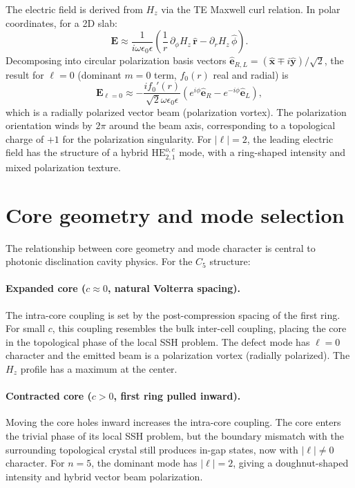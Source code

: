 \documentclass[12pt,a4paper,oneside]{book}
\theoremstyle{plain}
\theoremstyle{definition}
\theoremstyle{remark}
\newcommand{\vb}[1]{\bm{#1}}
\newcommand{\uv}[1]{\hat{\bm{#1}}}
\newcommand{\Efield}{\vb{E}}
\newcommand{\eps}{\epsilon}
\newcommand{\om}{\omega}
\begin{document}
The electric field is derived from $H_z$ via the TE Maxwell curl relation. In polar coordinates, for a 2D slab:
\begin{equation}
  \Efield \approx \frac{1}{i\om\eps_0\eps}\!\left(\frac{1}{r}\,\partial_\phi H_z\,\uv{r} - \partial_r H_z\,\hat{\phi}\right).
  \label{eq:E-from-Hz}
\end{equation}
Decomposing into circular polarization basis vectors $\hat{\vb{e}}_{R,L} = (\uv{x}\mp i\uv{y})/\sqrt{2}$, the result for $\ell = 0$ (dominant $m=0$ term, $f_0(r)$ real and radial) is
\begin{equation}
  \Efield_{\ell=0} \approx -\frac{i f_0'(r)}{\sqrt{2}\om\eps_0\eps}\!\left(e^{i\phi}\hat{\vb{e}}_R - e^{-i\phi}\hat{\vb{e}}_L\right),
  \label{eq:E-ell0}
\end{equation}
which is a radially polarized vector beam (polarization vortex). The polarization orientation winds by $2\pi$ around the beam axis, corresponding to a topological charge of $+1$ for the polarization singularity. For $|\ell|=2$, the leading electric field has the structure of a hybrid $\mathrm{HE}^{o,e}_{2,1}$ mode, with a ring-shaped intensity and mixed polarization texture.

\section{Core geometry and mode selection}
\label{sec:core-geometry}

The relationship between core geometry and mode character is central to photonic disclination cavity physics. For the $C_5$ structure:

\paragraph{Expanded core ($c \approx 0$, natural Volterra spacing).} The intra-core coupling is set by the post-compression spacing of the first ring. For small $c$, this coupling resembles the bulk inter-cell coupling, placing the core in the topological phase of the local SSH problem. The defect mode has $\ell = 0$ character and the emitted beam is a polarization vortex (radially polarized). The $H_z$ profile has a maximum at the center.

\paragraph{Contracted core ($c > 0$, first ring pulled inward).} Moving the core holes inward increases the intra-core coupling. The core enters the trivial phase of its local SSH problem, but the boundary mismatch with the surrounding topological crystal still produces in-gap states, now with $|\ell| \neq 0$ character. For $n=5$, the dominant mode has $|\ell|=2$, giving a doughnut-shaped intensity and hybrid vector beam polarization.
\end{document}
